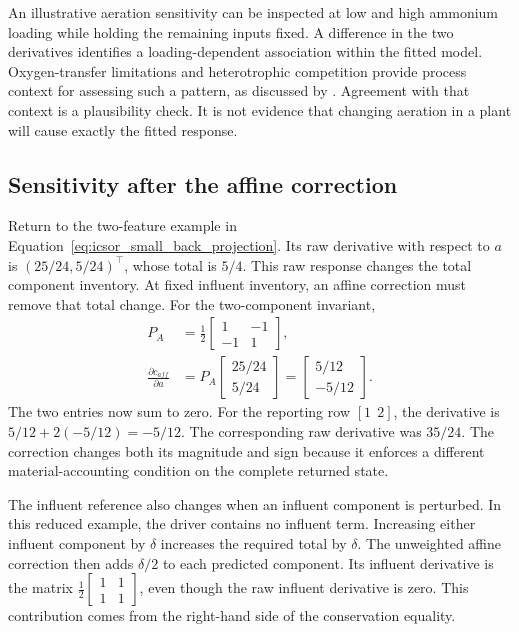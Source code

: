 An illustrative aeration sensitivity can be inspected at low and high ammonium loading while holding the remaining inputs fixed. A difference in the two derivatives identifies a loading-dependent association within the fitted model. Oxygen-transfer limitations and heterotrophic competition provide process context for assessing such a pattern, as discussed by \citet{StenstromSong1991}. Agreement with that context is a plausibility check. It is not evidence that changing aeration in a plant will cause exactly the fitted response.

\subsection{Sensitivity after the affine correction}

Return to the two-feature example in Equation~\eqref{eq:icsor_small_back_projection}. Its raw derivative with respect to \(a\) is \((25/24,5/24)^\top\), whose total is \(5/4\). This raw response changes the total component inventory. At fixed influent inventory, an affine correction must remove that total change. For the two-component invariant,
\begin{equation}
\label{eq:icsor_small_projection_derivative}
\begin{aligned}
P_A&=\frac{1}{2}\begin{bmatrix}1&-1\\-1&1\end{bmatrix},\\
\frac{\partial c_{aff}}{\partial a}
&=P_A\begin{bmatrix}25/24\\5/24\end{bmatrix}
=\begin{bmatrix}5/12\\-5/12\end{bmatrix}.
\end{aligned}
\end{equation}
The two entries now sum to zero. For the reporting row \([1\ \ 2]\), the derivative is \(5/12+2(-5/12)=-5/12\). The corresponding raw derivative was \(35/24\). The correction changes both its magnitude and sign because it enforces a different material-accounting condition on the complete returned state.

The influent reference also changes when an influent component is perturbed. In this reduced example, the driver contains no influent term. Increasing either influent component by \(\delta\) increases the required total by \(\delta\). The unweighted affine correction then adds \(\delta/2\) to each predicted component. Its influent derivative is the matrix \(\frac12\begin{bmatrix}1&1\\1&1\end{bmatrix}\), even though the raw influent derivative is zero. This contribution comes from the right-hand side of the conservation equality.

